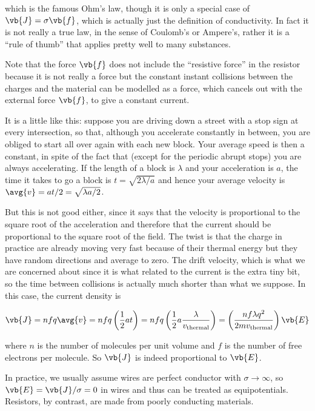 \documentclass[english,a4paper,12pt]{report}
\begin{document}
which is the famous Ohm's law, though it is only a special case of \(\vb{J} = \sigma \vb{f} \), which is actually just the definition of conductivity. In fact it is not really a true law, in the sense of Coulomb's or Ampere's, rather it is a ``rule of thumb'' that applies pretty well to many substances.

Note that the force \(\vb{f}\) does not include the ``resistive force'' in the resistor because it is not really a force but the constant instant collisions between the charges and the material can be modelled as a force, which cancels out with the external force \(\vb{f}\), to give a constant current.

It is a little like this: suppose you are driving down a street with a stop sign at every intersection, so that, although you accelerate constantly in between, you are obliged to start all over again with each new block. Your average speed is then a constant, in spite of the fact that (except for the periodic abrupt stops) you are always accelerating. If the length of a block is \(\lambda \)  and your acceleration is \(a\), the time it takes to go a block is \(t = \sqrt{2 \lambda /a} \) and hence your average velocity is \( \avg{v} =at /2 = \sqrt{\lambda a /2 }  \). 

But this is not good either, since it says that the velocity is proportional to the square root of the acceleration and therefore that the current should be proportional to the square root of the field. The twist is that the charge in practice are already moving very fast because of their thermal energy but they have random directions and average to zero. The drift velocity, which is what we are concerned about since it is what related to the current is the extra tiny bit, so the time between collisions is actually much shorter than what we suppose. In this case, the current density is

\begin{equation}
    \vb{J} = nfq\avg{v} = nfq \left( \frac{1}{2}at \right) = nfq \left( \frac{1}{2}a\frac{\lambda}{v_{\text{thermal} } }  \right) = \left( \frac{nf\lambda q^2}{2mv_{\text{thermal} } }  \right) \vb{E}  
\end{equation}

where \(n\) is the number of molecules per unit volume and \(f\) is the number of free electrons per molecule. So \(\vb{J} \) is indeed proportional to \(\vb{E} \).  

In practice, we usually assume wires are perfect conductor with \(\sigma \rightarrow \infty\), so \(\vb{E} = \vb{J} /\sigma  =0\) in wires and thus can be treated as equipotentials. Resistors, by contrast, are made from poorly conducting materials. 
\end{document}
